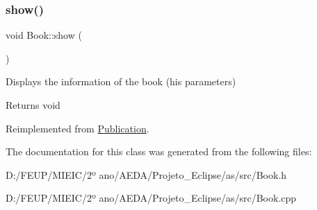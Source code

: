 \subsubsection{\texorpdfstring{show()}{show()}}
{\footnotesize\ttfamily void Book\+::show (\begin{DoxyParamCaption}{ }\end{DoxyParamCaption})\hspace{0.3cm}{\ttfamily [virtual]}}



Displays the information of the book (his parameters) 

\begin{DoxyReturn}{Returns}
void 
\end{DoxyReturn}


Reimplemented from \hyperlink{class_publication_aa4240a04fcecd6257e0d1a33e8f18ff0}{Publication}.



The documentation for this class was generated from the following files\+:\begin{DoxyCompactItemize}
\item 
D\+:/\+F\+E\+U\+P/\+M\+I\+E\+I\+C/2º ano/\+A\+E\+D\+A/\+Projeto\+\_\+\+Eclipse/as/src/Book.\+h\item 
D\+:/\+F\+E\+U\+P/\+M\+I\+E\+I\+C/2º ano/\+A\+E\+D\+A/\+Projeto\+\_\+\+Eclipse/as/src/Book.\+cpp\end{DoxyCompactItemize}
